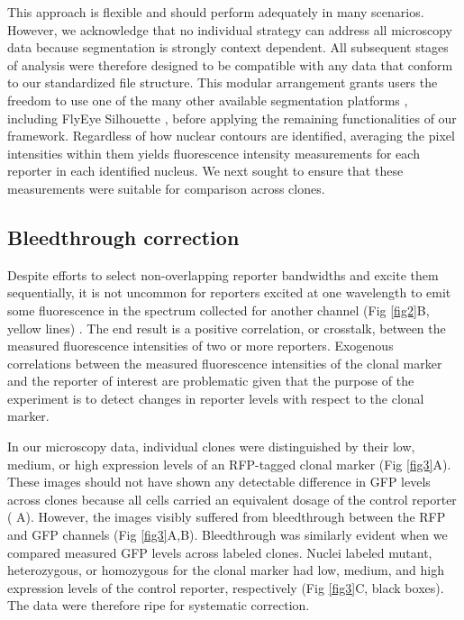 \documentclass[10pt,letterpaper]{article}
\begin{document}
This approach is flexible and should perform adequately in many scenarios. However, we acknowledge that no individual strategy can address all microscopy data because segmentation is strongly context dependent. All subsequent stages of analysis were therefore designed to be compatible with any data that conform to our standardized file structure. This modular arrangement grants users the freedom to use one of the many other available segmentation platforms \cite{Bugarski2014}, including FlyEye Silhouette \cite{Pelaez2015a}, before applying the remaining functionalities of our framework. Regardless of how nuclear contours are identified, averaging the pixel intensities within them yields fluorescence intensity measurements for each reporter in each identified nucleus. We next sought to ensure that these measurements were suitable for comparison across clones.


\subsection*{Bleedthrough correction}
\label{ch:correction}

Despite efforts to select non-overlapping reporter bandwidths and excite them sequentially, it is not uncommon for reporters excited at one wavelength to emit some fluorescence in the spectrum collected for another channel (Fig \ref{fig2}B, yellow lines) \cite{Bacia2012,Zinchuk2007}. The end result is a positive correlation, or crosstalk, between the measured fluorescence intensities of two or more reporters. Exogenous correlations between the measured fluorescence intensities of the clonal marker and the reporter of interest are problematic given that the purpose of the experiment is to detect changes in reporter levels with respect to the clonal marker.

In our microscopy data, individual clones were distinguished by their low, medium, or high expression levels of an RFP-tagged clonal marker (Fig \ref{fig3}A). These images should not have shown any detectable difference in GFP levels across clones because all cells carried an equivalent dosage of the control reporter ( A). However, the images visibly suffered from bleedthrough between the RFP and GFP channels (Fig \ref{fig3}A,B). Bleedthrough was similarly evident when we compared measured GFP levels across labeled clones. Nuclei labeled mutant, heterozygous, or homozygous for the clonal marker had low, medium, and high expression levels of the control reporter, respectively (Fig \ref{fig3}C, black boxes). The data were therefore ripe for systematic correction.
\end{document}
